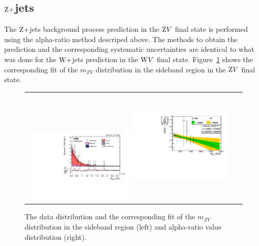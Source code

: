 \subsection{$\mathrm{Z}+$jets}
The $\mathrm{Z}+$jets background process prediction in the $\mathrm{Z} V$ final state is performed using the alpha-ratio method descriped above. The methods to obtain the prediction and the corresponding systematic uncertainties are identical to what was done for the $\mathrm{W}+$jets prediction in the $\mathrm{W} V$ final state. Figure~\ref{fig:zvfits} shows the corresponding fit of the $m_{ZV}$ distribution in the sideband region in the $\mathrm{Z} V$ final state.  

\begin{figure}[!htbp] 
	 \centering 
	 \begin{tabular}{cc}
	 \includegraphics[width=0.48\textwidth]{Plots/BackgroundEstimation/ZV/m_lvj_fitting/m_lvj_sb_lo_WJets0_xww__with_pull.pdf}
	 \includegraphics[width=0.48\textwidth,height=5.5cm]{Plots/BackgroundEstimation/ZV/ZVchannel_AlphaDistribution_AfterFit_New2.pdf}
	 \end{tabular}
	 \caption{The data distribution and the corresponding fit of the $m_{ZV}$ distribution in the sideband region (left) and alpha-ratio value distribution (right).}
	 \label{fig:zvfits}
\end{figure}



